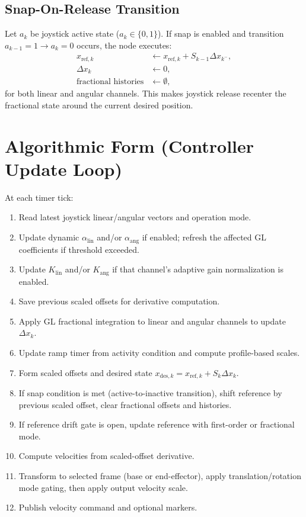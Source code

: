 \documentclass[11pt,a4paper]{article}
\begin{document}
\subsection{Snap-On-Release Transition}
Let $a_k$ be joystick active state ($a_k\in\{0,1\}$). If snap is enabled and transition
$ a_{k-1}=1 \rightarrow a_k=0$ occurs, the node executes:
\begin{align}
x_{\mathrm{ref},k} &\leftarrow x_{\mathrm{ref},k} + S_{k-1}\Delta x_{k^-},\\
\Delta x_k &\leftarrow 0, \\
\text{fractional histories} &\leftarrow \emptyset,
\end{align}
for both linear and angular channels.
This makes joystick release recenter the fractional state around the current desired position.

\section{Algorithmic Form (Controller Update Loop)}
At each timer tick:
\begin{enumerate}[leftmargin=*]
\item Read latest joystick linear/angular vectors and operation mode.
\item Update dynamic $\alpha_{\mathrm{lin}}$ and/or $\alpha_{\mathrm{ang}}$ if enabled; refresh the affected GL coefficients if threshold exceeded.
\item Update $K_{\mathrm{lin}}$ and/or $K_{\mathrm{ang}}$ if that channel's adaptive gain normalization is enabled.
\item Save previous scaled offsets for derivative computation.
\item Apply GL fractional integration to linear and angular channels to update $\Delta x_k$.
\item Update ramp timer from activity condition and compute profile-based scales.
\item Form scaled offsets and desired state $x_{\mathrm{des},k}=x_{\mathrm{ref},k}+S_k\Delta x_k$.
\item If snap condition is met (active-to-inactive transition), shift reference by previous scaled offset,
clear fractional offsets and histories.
\item If reference drift gate is open, update reference with first-order or fractional mode.
\item Compute velocities from scaled-offset derivative.
\item Transform to selected frame (base or end-effector), apply translation/rotation mode gating,
then apply output velocity scale.
\item Publish velocity command and optional markers.
\end{enumerate}
\end{document}
